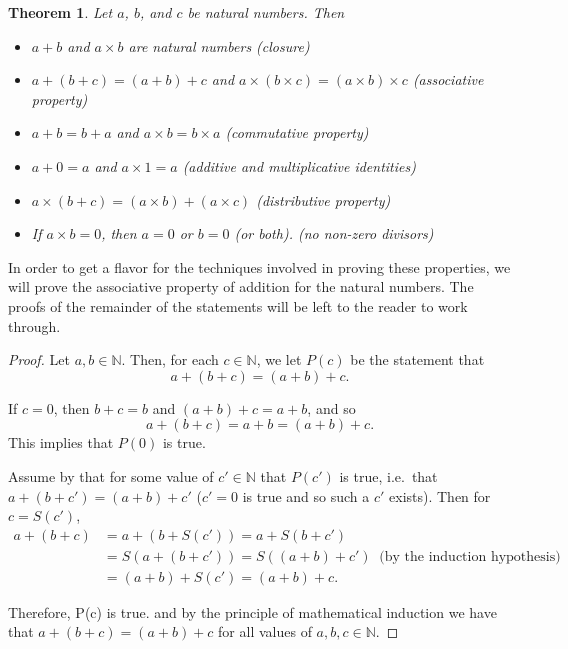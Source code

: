 \documentclass[
]{book}
\providecommand{\tightlist}{%
  \setlength{\itemsep}{0pt}\setlength{\parskip}{0pt}}
\newtheorem{theorem}{Theorem}[chapter]
\theoremstyle{definition}
\theoremstyle{definition}
\theoremstyle{definition}
\theoremstyle{remark}
\begin{document}
\begin{theorem}
\protect\hypertarget{thm:unnamed-chunk-50}{}{\label{thm:unnamed-chunk-50} }Let \(a\), \(b\), and \(c\) be natural numbers. Then

\begin{itemize}
\tightlist
\item
  \(a+b\) and \(a\times b\) are natural numbers (closure)
\item
  \(a+(b+c)=(a+b)+c\) and \(a\times (b\times c)=(a\times b)\times c\) (associative property)
\item
  \(a+b=b+a\) and \(a\times b=b\times a\) (commutative property)
\item
  \(a+0=a\) and \(a\times 1 =a\) (additive and multiplicative identities)
\item
  \(a \times (b+c)= (a\times b) + (a\times c)\) (distributive property)
\item
  If \(a\times b=0\), then \(a=0\) or \(b=0\) (or both). (no non-zero divisors)
\end{itemize}
\end{theorem}

In order to get a flavor for the techniques involved in proving these properties, we will prove the associative property of addition for the natural numbers. The proofs of the remainder of the statements will be left to the reader to work through.
\begin{proof}
{}Let \(a,b \in \mathbb{N}\). Then, for each \(c\in \mathbb{N}\), we let \(P(c)\) be the statement that
\[a+(b+c) = (a+b) + c.\]

If \(c=0\), then \(b+c=b\) and \((a+b)+c=a+b\), and so
\[a+(b+c)=a+b= (a+b)+c.\] This implies that \(P(0)\) is true.

Assume by that for some value of \(c'\in \mathbb{N}\) that \(P(c')\) is true, i.e.~that \(a+(b+c')=(a+b)+c'\) (\(c'=0\) is true and so such a \(c'\) exists). Then for \(c=S(c')\),
\begin{align*}
    a+(b+c) &= a+(b+S(c'))=a+S(b+c') \\
    &= S(a+(b+c')) = S((a+b)+c') \: \mbox{ (by the induction hypothesis)}\\
    &= (a+b)+S(c') = (a+b)+c.
\end{align*}

Therefore, P(c) is true. and by the principle of mathematical induction we have that \(a+(b+c)=(a+b)+c\) for all values of \(a,b,c\in \mathbb{N}\).
\end{proof}
\end{document}
